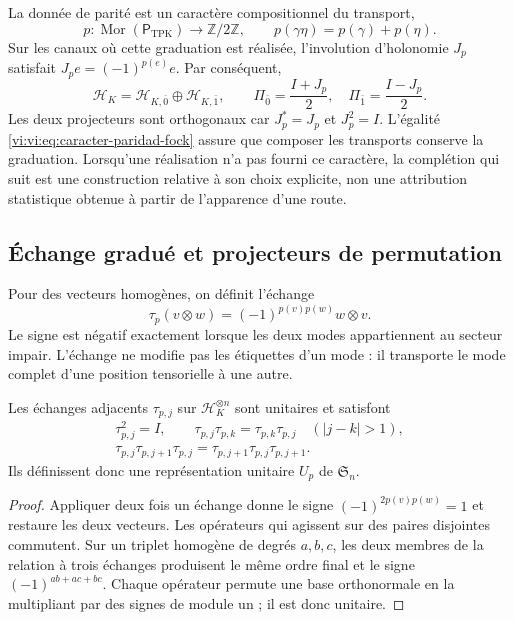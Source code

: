 La donnée de parité est un caractère compositionnel du transport,
\begin{equation}
 p:\operatorname{Mor}(\mathsf P_{\mathrm{TPK}})
 \longrightarrow\mathbb Z/2\mathbb Z,
 \qquad p(\gamma\eta)=p(\gamma)+p(\eta).
 \label{vi:vi:eq:caracter-paridad-fock}
\end{equation}
Sur les canaux où cette graduation est réalisée,
l’involution d’holonomie \(J_p\) satisfait
\(J_pe=(-1)^{p(e)}e\). Par conséquent,
\[
 \mathcal H_K=\mathcal H_{K,\bar0}\oplus\mathcal H_{K,\bar1},
 \qquad \Pi_{\bar0}=\frac{I+J_p}{2},\quad
 \Pi_{\bar1}=\frac{I-J_p}{2}.
\]
Les deux projecteurs sont orthogonaux car \(J_p^*=J_p\) et
\(J_p^2=I\). L’égalité \eqref{vi:vi:eq:caracter-paridad-fock} assure
que composer les transports conserve la graduation. Lorsqu’une réalisation
n’a pas fourni ce caractère, la complétion qui suit est une
construction relative à son choix explicite, non une attribution
statistique obtenue à partir de l’apparence d’une route.

\subsection{Échange gradué et projecteurs de permutation}
\label{vi:vi:subsec:intercambio-graduado}

Pour des vecteurs homogènes, on définit l’échange
\begin{equation}
 \tau_p(v\otimes w)=(-1)^{p(v)p(w)}w\otimes v.
 \label{vi:vi:eq:intercambio-graduado}
\end{equation}
Le signe est négatif exactement lorsque les deux modes appartiennent au
secteur impair. L’échange ne modifie pas les étiquettes d’un mode :
il transporte le mode complet d’une position tensorielle à une autre.

\begin{proposition}
\label{vi:vi:prop:permutaciones-graduadas}
Les échanges adjacents \(\tau_{p,j}\) sur
\(\mathcal H_K^{\otimes n}\) sont unitaires et satisfont
\[
\begin{gathered}
 \tau_{p,j}^2=I,\qquad
 \tau_{p,j}\tau_{p,k}=\tau_{p,k}\tau_{p,j}\quad(|j-k|>1),\\
 \tau_{p,j}\tau_{p,j+1}\tau_{p,j}
 =\tau_{p,j+1}\tau_{p,j}\tau_{p,j+1}.
\end{gathered}
\]
Ils définissent donc une représentation unitaire \(U_p\) de
\(\mathfrak S_n\).
\end{proposition}
\begin{proof}
Appliquer deux fois un échange donne le signe
\((-1)^{2p(v)p(w)}=1\) et restaure les deux vecteurs. Les opérateurs
qui agissent sur des paires disjointes commutent. Sur un triplet homogène
de degrés \(a,b,c\), les deux membres de la relation à trois
échanges produisent le même ordre final et le signe
\((-1)^{ab+ac+bc}\). Chaque opérateur permute une base orthonormale
en la multipliant par des signes de module un ; il est donc unitaire.
\end{proof}

